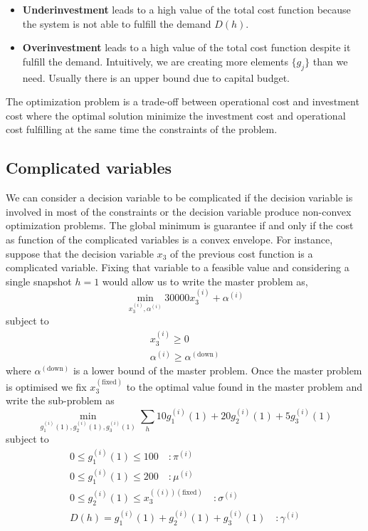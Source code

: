 \begin{itemize}
    \item \textbf{Underinvestment} leads to a high value of the total cost function because the system is not able to fulfill the demand $D(h)$.
    \item \textbf{Overinvestment} leads to a high value of the total cost function despite it fulfill the demand. Intuitively, we are creating more elements $\{g_{j}\}$ than we need. Usually there is an upper bound due to capital budget.
\end{itemize}
The optimization problem is a trade-off between operational cost and investment cost where the optimal solution minimize the investment cost and operational cost fulfilling at the same time the constraints of the problem.
\subsection{Complicated variables}
We can consider a decision variable to be complicated if the decision variable is involved in most of the constraints or the decision variable produce non-convex optimization problems. The global minimum is guarantee if and only if the cost as function of the complicated variables is a convex envelope. For instance, suppose that the decision variable $x_{3}$ of the previous cost function is a complicated variable. Fixing that variable to a feasible value and considering a single snapshot $h=1$ would allow us to write the master problem as,
\begin{equation}
    \min_{x_{3}^{(i)}, \alpha^{(i)}} 30000x_{3}^{(i)} + \alpha^{(i)}
\end{equation}
subject to
\begin{align}
    x_{3}^{(i)} \geq 0 \\
    \alpha^{(i)} \geq \alpha^{(\text{down})}
\end{align}
where $\alpha^{(\text{down})}$ is a lower bound of the master problem. Once the master problem is optimised we fix $x_{3}^{(\text{fixed})}$ to the optimal value found in the master problem and write the sub-problem as
\begin{equation}
    \min_{g_{1}^{(i)}(1), g_{2}^{(i)}(1), g_{3}^{(i)}(1)} \sum_{h}10g_{1}^{(i)}(1)+20g_{2}^{(i)}(1) + 5g_{3}^{(i)}(1)
\end{equation}
subject to
\begin{align}
    0 \leq g_{1}^{(i)}(1) \leq 100 \quad :\pi^{(i)} \\
    0 \leq g_{1}^{(i)}(1) \leq 200 \quad :\mu^{(i)} \\
    0 \leq g_{2}^{(i)}(1) \leq x_{3}^{((i))(\text{fixed})} \quad :\sigma^{(i)} \\
    D(h) = g_{1}^{(i)}(1) + g_{2}^{(i)}(1) + g_{3}^{(i)}(1) \quad :\gamma^{(i)}
\end{align}
